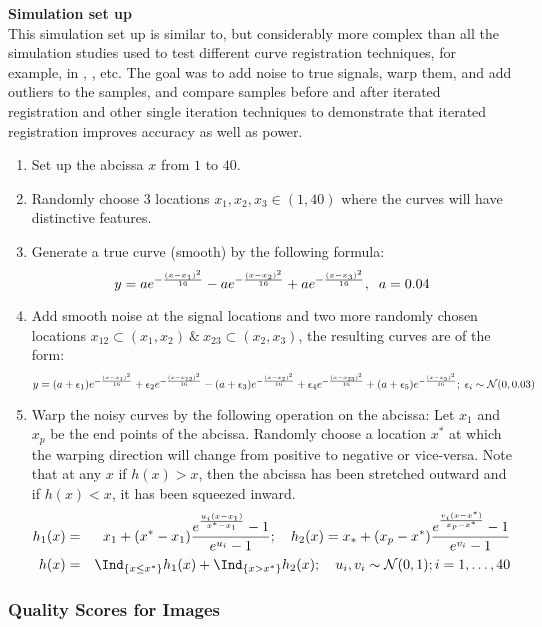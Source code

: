 \noindent
{\bf{Simulation set up}} \\
This simulation set up is similar to, but considerably more complex than all the simulation studies used to test different curve registration techniques, for example, in \cite{Kneip_Ramsay_2008_JASA}, \cite{Srivastava_etal_2011_v2_arXiv}, etc. The goal was to add noise to true signals, warp them, and add outliers to the samples, and compare samples before and after iterated registration and other single iteration techniques to demonstrate that iterated registration improves accuracy as well as power. 
\begin{enumerate}[nolistsep]
\item Set up the abcissa $x$ from $1$ to $40$.

\item Randomly choose 3 locations $x_1, x_2, x_3 \in (1, 40)$ where the curves will have distinctive features.

\item Generate a true curve (smooth) by the following formula: 
\begin{equation}
\footnotesize
y = ae^{-\frac{(x - x_1)^2}{16}} - ae^{-\frac{(x - x_2)^2}{16}} + ae^{-\frac{(x - x_3)^2}{16}},\ \ a=0.04 
\label{eq:SimTrue}
\end{equation}
\item Add smooth noise at the signal locations and two more randomly chosen locations $x_{12} \subset (x_1, x_2) \ \& \ x_{23} \subset (x_2, x_3) $, the resulting curves are of the form:
\begin{equation}
\footnotesize
 y = (a + \epsilon_1)e^{-\frac{(x - x_1)^2}{16}} + \epsilon_2e^{-\frac{(x - x_{12})^2}{16}} - (a + \epsilon_3)e^{-\frac{(x - x_2)^2}{16}} + \epsilon_4e^{-\frac{(x - x_{23})^2}{16}} + (a + \epsilon_5)e^{-\frac{(x - x_5)^2}{16}};\ \epsilon_i \sim \mathcal{N}(0, 0.03)
\label{eq:SimNoise}
\end{equation}
\item Warp the noisy curves by the following operation on the abcissa: Let $x_1$ and $x_p$ be the end points of the abcissa. Randomly choose a location $x^*$ at which the warping direction will change from positive to negative or vice-versa. Note that at any $x$ if $h(x) > x$, then the abcissa has been stretched outward and if $h(x) < x$, it has been squeezed inward. 
{\footnotesize
\begin{eqnarray}
h_1(x) &=& x_1 + (x^* - x_1) \frac{e^{\frac{u_i(x - x_1)}{x^* - x_1}} - 1}{e^{u_i} - 1};\  \ \ 
h_2(x) = x_* + (x_p - x^*) \frac{e^{\frac{v_i(x - x^*)}{x_p - x^*}} - 1}{e^{v_i} - 1} \\
\nonumber
h(x) &=& \Ind_{\{ x \le x^*\}} h_1(x) + \Ind_{\{ x > x^*\}} h_2(x);\  \ \ u_i, v_i \sim \mathcal{N}(0, 1); i = 1, \dots, 40
\label{eq:SimWarp}
\end{eqnarray}}

\end{enumerate}
\subsubsection{Quality Scores for Images} \label{Sec7_QualityScore}

